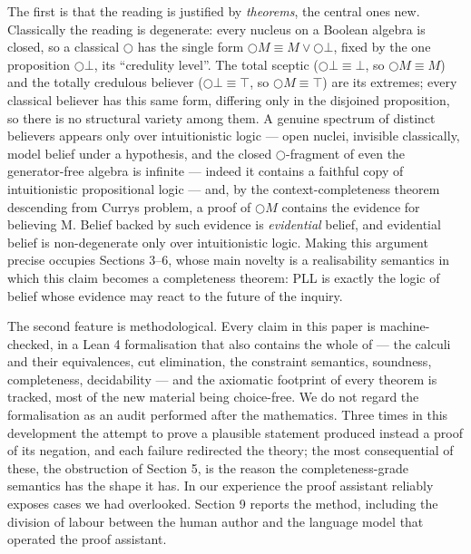 The first is that the reading is justified by \emph{theorems}, the central
ones new. Classically the reading is degenerate: every nucleus on a
Boolean algebra is closed, so a classical \ensuremath{\bigcirc} has the single form
\ensuremath{\bigcirc M \equiv M \vee \bigcirc\bot}, fixed by the one
proposition \ensuremath{\bigcirc\bot}, its ``credulity level''. The total
sceptic (\ensuremath{\bigcirc\bot \equiv \bot}, so
\ensuremath{\bigcirc M \equiv M}) and the totally credulous believer
(\ensuremath{\bigcirc\bot \equiv \top}, so
\ensuremath{\bigcirc M \equiv \top}) are its extremes; every classical
believer has this same form, differing only in the disjoined proposition, so
there is no structural variety among them. A genuine spectrum of distinct
believers appears only over intuitionistic logic ---
open nuclei, invisible classically, model belief under a hypothesis,
and the closed \ensuremath{\bigcirc}-fragment of even the generator-free algebra is
infinite --- indeed it contains a faithful copy of intuitionistic
propositional logic --- and,
by the context-completeness theorem descending from Curry\textquotesingle s problem, a
proof of \ensuremath{\bigcirc M} contains the evidence for believing M. Belief
backed by such evidence is \emph{evidential} belief, and evidential belief is
non-degenerate only over intuitionistic logic. Making this argument
precise occupies Sections 3--6, whose main novelty is a realisability
semantics in which this claim becomes a completeness theorem: PLL is
exactly the logic of belief whose evidence may react to the future of
the inquiry.

The second feature is methodological. Every claim in this paper is
machine-checked, in a Lean 4 formalisation that also contains the whole
of \cite{FairtloughMendler1997} --- the calculi and their equivalences, cut elimination,
the constraint semantics, soundness, completeness, decidability --- and
the axiomatic footprint of every theorem is tracked, most of the new
material being choice-free. We do not regard the formalisation as an
audit performed after the mathematics. Three times in this development
the attempt to prove a plausible statement produced instead a proof of
its negation, and each failure redirected the theory; the most
consequential of these, the obstruction of Section 5, is the reason the
completeness-grade semantics has the shape it has. In our experience the
proof assistant reliably exposes cases we had overlooked. Section 9
reports the method, including the
division of labour between the human author and the language model that
operated the proof assistant.

